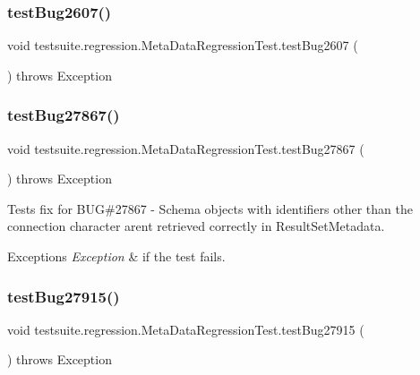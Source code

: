 \subsubsection{\texorpdfstring{test\+Bug2607()}{testBug2607()}}
{\footnotesize\ttfamily void testsuite.\+regression.\+Meta\+Data\+Regression\+Test.\+test\+Bug2607 (\begin{DoxyParamCaption}{ }\end{DoxyParamCaption}) throws Exception}

\mbox{\label{classtestsuite_1_1regression_1_1_meta_data_regression_test_ad4bf6071c2581485e1d8d44e36d385ae}} 
\subsubsection{\texorpdfstring{test\+Bug27867()}{testBug27867()}}
{\footnotesize\ttfamily void testsuite.\+regression.\+Meta\+Data\+Regression\+Test.\+test\+Bug27867 (\begin{DoxyParamCaption}{ }\end{DoxyParamCaption}) throws Exception}

Tests fix for B\+UG\#27867 -\/ Schema objects with identifiers other than the connection character aren\textquotesingle{}t retrieved correctly in Result\+Set\+Metadata.


\begin{DoxyExceptions}{Exceptions}
{\em Exception} & if the test fails. \\
\hline
\end{DoxyExceptions}
\mbox{\label{classtestsuite_1_1regression_1_1_meta_data_regression_test_a32361bc11ddd1b2990adfa15697e27ae}} 
\subsubsection{\texorpdfstring{test\+Bug27915()}{testBug27915()}}
{\footnotesize\ttfamily void testsuite.\+regression.\+Meta\+Data\+Regression\+Test.\+test\+Bug27915 (\begin{DoxyParamCaption}{ }\end{DoxyParamCaption}) throws Exception}

